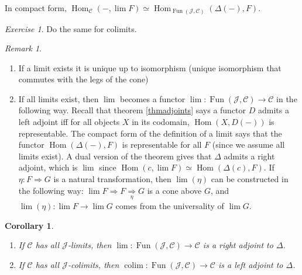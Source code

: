 \documentclass{article}
\newcommand{\cat}{\mathcal{C}}
\newcommand{\Jcat}{\mathcal{J}}
\DeclareMathOperator{\Hom}{Hom}
\DeclareMathOperator{\Fun}{Fun}
\DeclareMathOperator{\colim}{colim}
\theoremstyle{plain}
\newtheorem{corollary}[theorem]{Corollary}
\theoremstyle{definition}
\theoremstyle{remark}
\newtheorem*{remark}{Remark}
\newtheorem*{exercise}{Exercise}
\begin{document}
In compact form, $\Hom_\cat(-, \lim F) \simeq \Hom_{\Fun(\Jcat,\cat)} (\Delta(-),F)$.

\begin{exercise}
    Do the same for colimits.
\end{exercise}

\begin{remark}\leavevmode
    \begin{enumerate}
        \item If a limit exists it is unique up to isomorphism (unique isomorphism that commutes with the legs of the cone)
        \item If all limits exist, then $\lim$ becomes a functor $\lim : \Fun(\Jcat, \cat) \to \cat$ in the following way. Recall that theorem \ref{thmadjoints} says a functor $D$ admits a left adjoint iff for all objects $X$ in its codomain, $\Hom(X,D(-))$ is representable. The compact form of the definition of a limit says that the functor $\Hom(\Delta(-),F)$ is representable for all $F$ (since we assume all limits exist). A dual version of the theorem gives that $\Delta$ admits a right adjoint, which is $\lim$ since $\Hom(c,\lim F) \simeq \Hom(\Delta(c),F)$. If $\eta : F \Rightarrow G$ is a natural transformation, then $\lim(\eta)$ can be constructed in the following way: $\lim F \Rightarrow F \underset{\eta}{\Rightarrow} G$ is a cone above $G$, and $\lim(\eta) : \lim F \to \lim G$ comes from the universality of $\lim G$.
    \end{enumerate}
\end{remark}

\begin{corollary} \leavevmode
    \begin{enumerate}
        \item If $\cat$ has all $\Jcat$-limits, then $\lim : \Fun(\Jcat,\cat) \to \cat$ is a right adjoint to $\Delta$.
        \item If $\cat$ has all $\Jcat$-colimits, then $\colim : \Fun(\Jcat,\cat) \to \cat$ is a left adjoint to $\Delta$.
    \end{enumerate}
\end{corollary}
\end{document}
